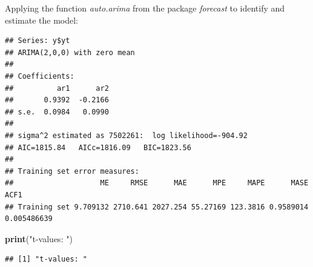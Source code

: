 \documentclass[]{article}
\newenvironment{Shaded}{\begin{snugshade}}{\end{snugshade}}
\newcommand{\ControlFlowTok}[1]{\textcolor[rgb]{0.13,0.29,0.53}{\textbf{#1}}}
\newcommand{\DataTypeTok}[1]{\textcolor[rgb]{0.13,0.29,0.53}{#1}}
\newcommand{\DecValTok}[1]{\textcolor[rgb]{0.00,0.00,0.81}{#1}}
\newcommand{\KeywordTok}[1]{\textcolor[rgb]{0.13,0.29,0.53}{\textbf{#1}}}
\newcommand{\NormalTok}[1]{#1}
\newcommand{\OperatorTok}[1]{\textcolor[rgb]{0.81,0.36,0.00}{\textbf{#1}}}
\newcommand{\OtherTok}[1]{\textcolor[rgb]{0.56,0.35,0.01}{#1}}
\newcommand{\StringTok}[1]{\textcolor[rgb]{0.31,0.60,0.02}{#1}}
\begin{document}
Applying the function \emph{auto.arima} from the package \emph{forecast}
to identify and estimate the model:

\begin{Shaded}
\end{Shaded}

\begin{verbatim}
## Series: y$yt 
## ARIMA(2,0,0) with zero mean 
## 
## Coefficients:
##          ar1      ar2
##       0.9392  -0.2166
## s.e.  0.0984   0.0990
## 
## sigma^2 estimated as 7502261:  log likelihood=-904.92
## AIC=1815.84   AICc=1816.09   BIC=1823.56
## 
## Training set error measures:
##                    ME     RMSE      MAE      MPE     MAPE      MASE        ACF1
## Training set 9.709132 2710.641 2027.254 55.27169 123.3816 0.9589014 0.005486639
\end{verbatim}

\begin{Shaded}
\begin{Highlighting}[]
\KeywordTok{print}\NormalTok{(}\StringTok{"t-values: "}\NormalTok{)}
\end{Highlighting}
\end{Shaded}

\begin{verbatim}
## [1] "t-values: "
\end{verbatim}

\begin{Shaded}
\end{Shaded}
\end{document}
